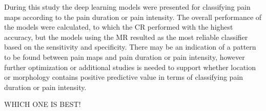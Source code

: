 During this study the deep learning models were presented for classifying pain maps according to the pain duration or pain intensity.
The overall performance of the models were calculated, to which the CR performed with the highest accuracy, but the models using the MR resulted as the most reliable classifier based on the sensitivity and specificity. 
There may be an indication of a pattern to be found between pain maps and pain duration or pain intensity, however further optimization or additional studies is needed to support whether location or morphology contains positive predictive value in terms of classifying pain duration or pain intensity. 


WHICH ONE IS BEST!